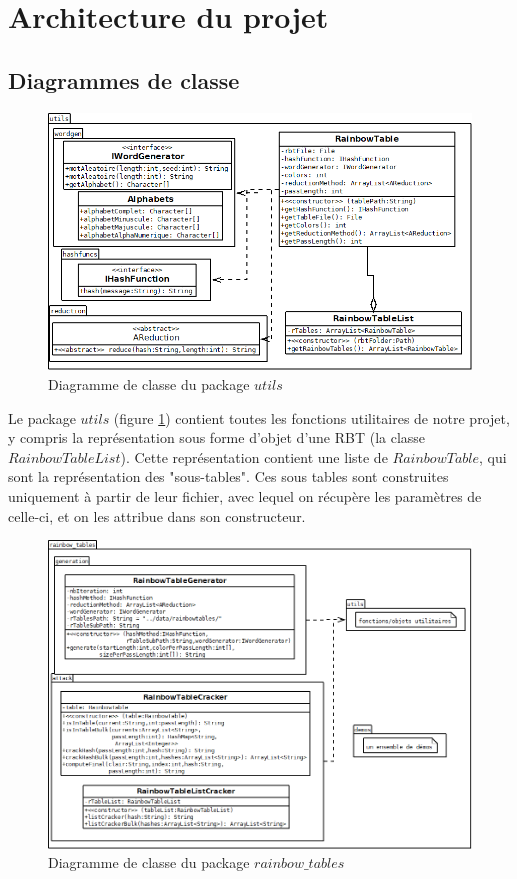 \documentclass[french,12pt]{article}
\begin{document}
    \section{Architecture du projet}
    \subsection{Diagrammes de classe}


    \begin{figure}[H]
             \centering
             \includegraphics[scale=0.5, frame]{img/diagrams/utils.png}
             \caption{Diagramme de classe du package $utils$}
             \label{fig:diautils}
    \end{figure}

    Le package $utils$ (figure \ref{fig:diautils}) contient toutes les fonctions utilitaires de notre projet, y compris la représentation sous forme d'objet d'une RBT (la classe $RainbowTableList$). Cette représentation contient une liste de $RainbowTable$, qui sont la représentation des "sous-tables". Ces sous tables sont construites uniquement à partir de leur fichier, avec lequel on récupère les paramètres de celle-ci, et on les attribue dans son constructeur.
    
    \begin{figure}[H]
             \centering
             \includegraphics[scale=0.5, frame]{img/diagrams/rainbow_tables.png}
             \caption{Diagramme de classe du package $rainbow\_tables$}
             \label{fig:diartables}
    \end{figure}
\end{document}
